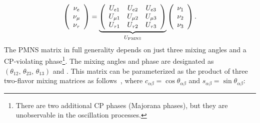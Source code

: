 \begin{equation}
\left(\begin{array}{ccc} \nu_e \\ \nu_\mu \\ \nu_\tau \end{array} \right)= 
\underbrace{
  \left(\begin{array}{ccc}
      U_{e 1} &  U_{e 2} & U_{e 3} \\ 
      U_{\mu1} &  U_{\mu2} & U_{\mu 3} \\ 
      U_{\tau 1} &  U_{\tau 2} & U_{\tau 3} 
    \end{array} \right)
}_{U_{\rm PMNS}} \left(\begin{array}{ccc} \nu_1 \\ \nu_2 \\ \nu_3 \end{array} \right).
\label{eqn:pmns0}
\end{equation}
The PMNS matrix in full generality depends on just three mixing angles
and a CP-violating phase\footnote{There are two additional CP phases (Majorana phases), but they are unobservable in the oscillation processes.}.  The mixing angles and phase are designated
as $(\theta_{12},\, \theta_{23},\, \theta_{13})$ and
\deltacp.
This matrix can be parameterized as the product of three
two-flavor mixing matrices as follows~\cite{Schechter:1980gr}, where $c_{\alpha \beta}=\cos \theta_{\alpha \beta}$ and $s_{\alpha
  \beta}=\sin \theta_{\alpha \beta}$:

